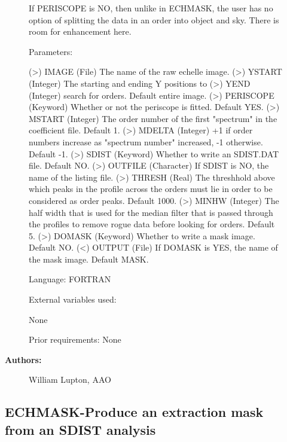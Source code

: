 \begin{description}
\begin{description}
\begin{terminalv}
    If PERISCOPE is NO, then unlike in ECHMASK, the user has no
    option of splitting the data in an order into object and sky.
    There is room for enhancement here.

 Parameters:

    (>) IMAGE         (File) The name of the raw echelle image.
    (>) YSTART        (Integer) The starting and ending Y positions to
    (>) YEND          (Integer) search for orders. Default entire image.
    (>) PERISCOPE     (Keyword) Whether or not the periscope is fitted.
                      Default YES.
    (>) MSTART        (Integer) The order number of the first
                      "spectrum" in the coefficient file. Default 1.
    (>) MDELTA        (Integer) +1 if order numbers increase as
                      "spectrum number" increased, -1 otherwise.
                      Default -1.
    (>) SDIST         (Keyword) Whether to write an SDIST.DAT file.
                      Default NO.
    (>) OUTFILE       (Character) If SDIST is NO, the name of the
                      listing file.
    (>) THRESH        (Real) The threshhold above which peaks in the
                      profile across the orders must lie in order to
                      be considered as order peaks. Default 1000.
    (>) MINHW         (Integer) The half width that is used for the
                      median filter that is passed through the
                      profiles to remove rogue data before looking for
                      orders. Default 5.
    (>) DOMASK        (Keyword) Whether to write a mask image. Default
                      NO.
    (<) OUTPUT        (File) If DOMASK is YES, the name of the mask
                      image. Default MASK.

 Language:
    FORTRAN

 External variables used:

    None

 Prior requirements:
    None

\end{terminalv}

\item [\textbf{Authors:}]
 William Lupton, AAO
\end{description}
\subsection{ECHMASK-\label{ECHMASK}Produce an extraction mask from an SDIST analysis}
\begin{description}


\end{description}
\end{description}
